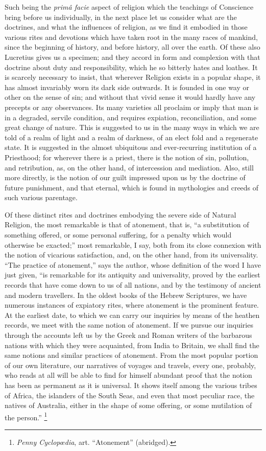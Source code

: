 Such being the \emph{primâ facie} aspect of religion which the
teachings of Conscience bring before us individually, in the
next place let us consider what are the doctrines, and what the
influences of religion, as we find it embodied in those various rites
and devotions which have taken root in the many races of mankind,
since the beginning of history, and before history, all over the
earth. Of these also Lucretius gives us a specimen; and they accord in
form and complexion with that doctrine about duty and responsibility,
which he so bitterly hates and loathes. It is scarcely necessary to
insist, that wherever Religion exists in a popular shape, it has
almost invariably worn its dark side outwards. It is founded in one
way or other on the sense of sin; and without that vivid sense it
would hardly have any precepts or any observances. Its many varieties
all proclaim or imply that man is in a degraded, servile condition,
and requires expiation, reconciliation, and some great change of
nature. This is suggested to us in the many ways in which we are told
of a realm of light and a realm of darkness, of an elect fold and a
regenerate state. It is suggested in the almost ubiquitous and
ever-recurring institution of a Priesthood; for wherever there is a
priest, there is the notion of sin, pollution, and retribution, as, on
the other hand, of intercession and mediation. Also, still more
directly, is the notion of our guilt impressed upon us by the doctrine
of future punishment, and that eternal, which is found in mythologies
and creeds of such various parentage.

Of these distinct rites and doctrines embodying the severe side of
Natural Religion, the most remarkable is that of atonement, that is,
``a substitution of something offered, or some personal
suffering, for a penalty which would otherwise be exacted;'' most
remarkable, I say, both from its close connexion with the notion of
vicarious satisfaction, and, on the other hand, from its universality.
``The practice of atonement,'' says the author, whose
definition of the word I have just given, ``is remarkable for its
antiquity and universality, proved by the earliest records that have
come down to us of all nations, and by the testimony of ancient and
modern travellers. In the oldest books of the Hebrew Scriptures, we
have numerous instances of expiatory rites, where atonement is the
prominent feature. At the earliest date, to which we can carry our
inquiries by means of the heathen records, we meet with the same
notion of atonement. If we pursue our inquiries through the accounts
left us by the Greek and Roman writers of the barbarous nations with
which they were acquainted, from India to Britain, we shall find the
same notions and similar practices of atonement. From the most popular
portion of our own literature, our narratives of voyages and travels,
every one, probably, who reads at all will be able to find for himself
abundant proof that the notion has been as permanent as it is
universal. It shows itself among the various tribes of Africa, the
islanders of the South Seas, and even that most peculiar race, the
natives of Australia, either in the shape of some offering, or some
mutilation of the person.'' \footnote{\emph{Penny Cyclopœdia},
art. ``Atonement'' (abridged).}

